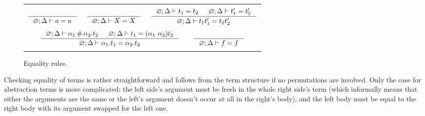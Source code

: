 \documentclass[english, mgr]{iithesis}
\newcommand{\solverRule}{\vdash}
\begin{document}
\begin{figure}[htbp]
    \centering
    \begin{tabularx}{\textwidth}{|C|}
      \hline \\ $
      \inference{
      }{
        \emptyenv ; \icEnv \solverRule \atomv = \atomv
      }
      \quad\;
      \inference{
      }{
        \emptyenv ; \icEnv \solverRule \termv = \termv
      }
      \quad\;
      \inference{
        \emptyenv ; \icEnv \solverRule \term_1 = \term_2
        &
        \emptyenv ; \icEnv \solverRule \term_1' = \term_2'
      }{
        \emptyenv ; \icEnv \solverRule \term_1 \term_1' = \term_2 \term_2'
      }
      $ \\ \\ $
      \inference{
        \emptyenv ; \icEnv \solverRule \atomexp_1 \cfresh \tbind{\atomexp_2}\term_2
        &
        \emptyenv ; \icEnv \solverRule \term_1 = \permswap{\atomexp_1}{\atomexp_2} \term_2
      }{
        \emptyenv ; \icEnv \solverRule \tbind{\atomexp_1} \term_1 = \tbind{\atomexp_2} \term_2
      } \qquad
      \inference{
      }{
        \emptyenv ; \icEnv \solverRule \symb = \symb
      }
      $ \\ \\ \hline
      \end{tabularx}
  \caption{Equality rules.}
  \label{fig:equality-reduction-rules}
\end{figure}
Checking equality of terms is rather straightforward and follows from the
term structure if no permutations are involved.
Only the case for abstraction terms is more complicated:
the left side's argument must be fresh in the whole right side's term
(which informally means that either the arguments are the same or
the left's argument doesn't occur at all in the right's body),
and the left body must be equal to the right body with its argument swapped for the left one.
\end{document}
